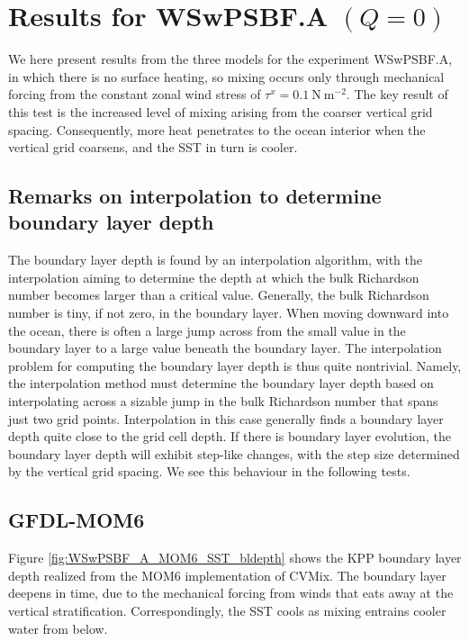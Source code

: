 \section{Results for WSwPSBF.A $(Q=0)$}
\label{section:WSwPSBFA}

We here present results from the three models for the experiment
WSwPSBF.A, in which there is no surface heating, so mixing occurs only
through mechanical forcing from the constant zonal wind stress of
$\tau^{x} = 0.1~\mbox{N}~\mbox{m}^{-2}$.  The key result of this test
is the increased level of mixing arising from the coarser vertical
grid spacing.  Consequently, more heat penetrates to the ocean
interior when the vertical grid coarsens, and the SST in turn is
cooler.

\subsection{Remarks on interpolation to determine boundary layer depth}
\label{subsection:interpolation-difficulties}

The boundary layer depth is found by an interpolation algorithm, with
the interpolation aiming to determine the depth at which the bulk
Richardson number becomes larger than a critical value.  Generally,
the bulk Richardson number is tiny, if not zero, in the boundary
layer.  When moving downward into the ocean, there is often a large
jump across from the small value in the boundary layer to a large
value beneath the boundary layer.  The interpolation problem for
computing the boundary layer depth is thus quite nontrivial.  Namely,
the interpolation method must determine the boundary layer depth based
on interpolating across a sizable jump in the bulk Richardson number
that spans just two grid points.  Interpolation in this case generally
finds a boundary layer depth quite close to the grid cell depth.  If
there is boundary layer evolution, the boundary layer depth will
exhibit step-like changes, with the step size determined by the
vertical grid spacing.  We see this behaviour in the following tests.


\subsection{GFDL-MOM6} 

Figure \ref{fig:WSwPSBF_A_MOM6_SST_bldepth} shows the KPP boundary
layer depth realized from the MOM6 implementation of CVMix.  The
boundary layer deepens in time, due to the mechanical forcing from
winds that eats away at the vertical stratification.  Correspondingly,
the SST cools as mixing entrains cooler water from below.  

